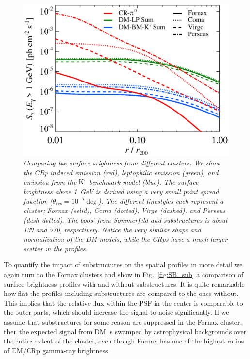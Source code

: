\documentclass[10pt,aps,pra,reprint,amsmath,amsfonts,amssymb,showpacs]{revtex4-1}
\newcommand{\rmn}{\mathrm}
\newcommand{\psf}{\theta_\rmn{res}}
\newcommand{\Kp}{\rmn{K}`}
\begin{document}
\begin{figure}
 \includegraphics[width=0.99\columnwidth]{figures/SB.v9.1GeV.SF300.SubMass.elmu.eps}
\caption{\it Comparing the surface brightness from different
  clusters. We show the CRp induced emission (red), leptophilic
  emission (green), and emission from the $\Kp$ benchmark model
  (blue). The surface brightness above 1~GeV is derived using a very
  small point spread function ($\psf=10^{-5}\deg$). The
  different linestyles each represent a cluster; Fornax (solid), Coma
  (dotted), Virgo (dashed), and Perseus (dash-dotted). The boost from
  Sommerfeld and substructures is about 130 and 570,
  respectively. Notice the very similar shape and normalization of the DM
  models, while the CRps have a much larger scatter in the profiles.}
 \label{fig:SB_clu}
\end{figure}

To quantify the impact of substructures on the spatial profiles in
more detail we again turn to the Fornax clusters and show in
Fig.~\ref{fig:SB_sub} a comparison of surface brightness profiles with
and without substructures. It is quite remarkable how flat the
profiles including substructures are compared to the ones
without. This implies that the relative flux within the PSF in the
center is comparable to the outer parts, which should increase the
signal-to-noise significantly. If we assume that substructures for
some reason are suppressed in the Fornax cluster, then the expected
signal from DM is swamped by astrophysical backgrounds over the entire
extent of the cluster, even though Fornax has one of the highest
ratios of DM/CRp gamma-ray brightness.
\end{document}
